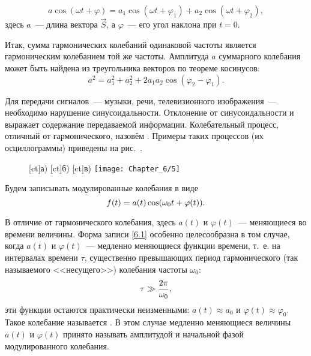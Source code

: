 \begin{equation*}
	a\cos(\omega t + \varphi)=a_1\cos(\omega t+\varphi_1)+a_2\cos(\omega t + \varphi_2),
\end{equation*}
здесь $a$~--- длина вектора $\vec{S}$, а $\varphi$~--- его угол наклона при $t = 0$.

Итак, сумма гармонических колебаний одинаковой частоты является гармоническим колебанием той же частоты. Амплитуда $a$
суммарного колебания может быть найдена из треугольника векторов по теореме косинусов:
\begin{equation*}
	a^2=a_1^2+a_2^2+2a_1a_2\cos(\varphi_2-\varphi_1).
\end{equation*}


Для передачи сигналов~--- музыки, речи, телевизионного изображения~--- необходимо нарушение синусоидальности. Отклонение
от синусоидальности и выражает содержание передаваемой информации. Колебательный процесс, отличный от гармонического,
назовём . Примеры таких процессов (их осциллограммы) приведены на рис.~.

\begin{figure}[h!]
	[ct]{а)}
	[ct]{б)}
	[ct]{в)}
	\texttt{[image: Chapter\_6/5]}
	\caption{}
\end{figure}

Будем записывать модулированные колебания в виде
\begin{equation}
	\eqmark{6.1}
	f(t)=a(t)\cos(\omega_0t+\varphi(t)).
\end{equation}

В отличие от гармонического колебания, здесь $a(t)$ и $\varphi(t)$~--- меняющиеся во времени величины. Форма записи \eqref{6.1}
особенно целесообразна в том случае, когда $a(t)$ и $\varphi(t)$~--- медленно меняющиеся функции времени, т.~е. на
интервалах времени $\tau$, существенно превышающих период гармонического (так называемого <<несущего>>) колебания
частоты $\omega_0$:
\begin{equation}
	\eqmark{6.2}
	\tau \gg \frac{2\pi}{\omega_0},
\end{equation}
эти функции остаются практически неизменными: $a(t)\approx a_{0}$ и $\varphi(t)\approx\varphi_0$. Такое колебание называется
. В этом случае медленно меняющиеся величины $a(t)$ и $\varphi(t)$ принято называть амплитудой и
начальной фазой модулированного колебания.

